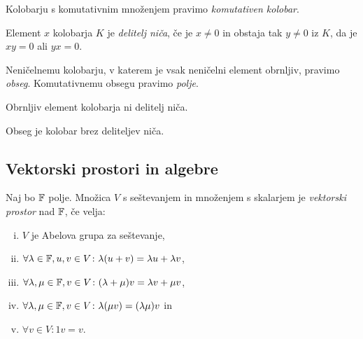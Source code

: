 \obvs

\begin{definicija}
Kolobarju s komutativnim množenjem pravimo
\emph{komutativen kolobar}.
\end{definicija}

\begin{definicija}
Element $x$ kolobarja $K$ je
\emph{delitelj niča},
če je $x \ne 0$ in obstaja tak $y \ne 0$ iz $K$, da je $xy = 0$ ali
$yx = 0$.
\end{definicija}

\begin{definicija}
Neničelnemu kolobarju, v katerem je vsak neničelni element
obrnljiv, pravimo \emph{obseg}.
Komutativnemu obsegu pravimo
\emph{polje}.
\end{definicija}

\begin{trditev}
Obrnljiv element kolobarja ni delitelj niča.
\end{trditev}

\obvs

\begin{posledica}
Obseg je kolobar brez deliteljev niča.
\end{posledica}

\newpage

\subsection{Vektorski prostori in algebre}

\begin{definicija}
Naj bo $\mathbb{F}$ polje. Množica $V$ s seštevanjem in množenjem s
skalarjem je
\emph{vektorski prostor}
nad $\mathbb{F}$, če velja:

\begin{enumerate}[i)]
\item $V$ je Abelova grupa za seštevanje,
\item $\forall \lambda \in \mathbb{F}, u,v \in V \colon
\lambda(u+v) = \lambda u + \lambda v$,
\item $\forall \lambda, \mu \in \mathbb{F}, v \in V \colon
(\lambda + \mu)v = \lambda v + \mu v$,
\item $\forall \lambda, \mu \in \mathbb{F}, v \in V \colon
\lambda(\mu v) = (\lambda \mu)v$ in
\item $\forall v \in V \colon 1v = v$.
\end{enumerate}
\end{definicija}

